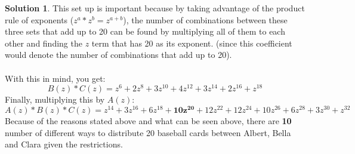 \documentclass{article}
\theoremstyle{definition}
\newtheorem*{solution}{Solution}
\begin{document}
\begin{solution}
This set up is important because by taking advantage of the product rule of exponents ($z^a * z^b = z^{a+b}$), the number of combinations between these three sets that add up to 20 can be found by multiplying all of them to each other and finding the $z$ term that has 20 as its exponent. (since this coefficient would denote the number of combinations that add up to 20).\\\\
With this in mind, you get:
$$ B(z) * C(z) = z^6 + 2z^8 + 3z^{10} + 4z^{12} + 3z^{14} + 2z^{16} + z^{18} $$
Finally, multiplying this by $A(z)$:
$$ A(z) * B(z) * C(z) = z^{14} + 3z^{16} + 6z^{18}+ \mathbf{10z^{20}}+ 12z^{22}+ 12z^{24}+ 10z^{26}+ 6z^{28}+ 3z^{30}+ z^{32} $$
Because of the reasons stated above and what can be seen above, there are \textbf{10} number of different ways to distribute 20 baseball cards between Albert, Bella and Clara given the restrictions.
\end{solution}
\end{document}
